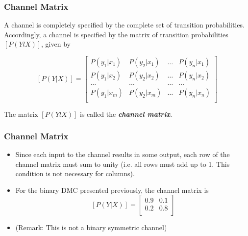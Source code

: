 \documentclass[a4]{beamer}
\begin{document}

%

\begin{frame}
\frametitle{Channel Matrix}

A channel is completely specified by the complete set of transition probabilities. Accordingly, a
channel is specified by the matrix of transition probabilities $[P(YlX)]$, given by

\[  [P(Y|X)]  = \left[ \begin{array}{cccc}
P(y_1|x_1) & P(y_2|x_1) & \ldots & P(y_n|x_1) \\
P(y_1|x_2) & P(y_2|x_2) & \ldots & P(y_n|x_2) \\
\ldots & \ldots & \ldots & \ldots \\
P(y_1|x_m) & P(y_2|x_m) & \ldots & P(y_n|x_n) \\
\end{array} \right] \]


The matrix $[P(YlX)]$ is called the \textbf{\emph{channel matrix}}.
 \end{frame}

\begin{frame}
\frametitle{Channel Matrix}
\begin{itemize}
\item Since each input to the channel results in some
output, each row of the channel matrix must sum to unity (i.e. all rows must add up to 1. This condition is not necessary for columns).
\item For the binary DMC presented previously, the channel matrix is
\[  [P(Y|X)]  = \left[ \begin{array}{cc}
0.9 & 0.1  \\
0.2 & 0.8 \\
\end{array} \right] \]
\item (Remark: This is not a binary symmetric channel)
\end{itemize}
\end{frame}
\end{document}
